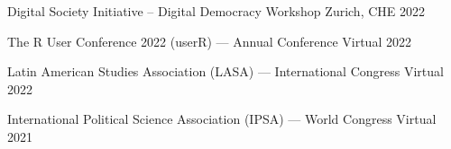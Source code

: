 
\begin{cvhonors}
\cvconf
{Digital Society Initiative -- Digital Democracy Workshop} 
{Zurich, CHE}
{2022}
\end{cvhonors}




\begin{cvhonors}
\cvconf
{The R User Conference 2022 (userR) --- Annual Conference} 
{Virtual}
{2022}
\end{cvhonors}

\begin{cvhonors}
\cvconf
{Latin American Studies Association (LASA) --- International Congress} 
{Virtual}
{2022}
\end{cvhonors}




\begin{cvhonors}
\cvconf
{International Political Science Association (IPSA) --- World Congress} 
{Virtual}
{2021}
\end{cvhonors}


